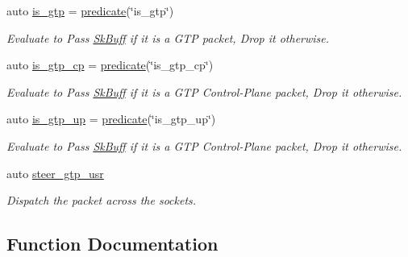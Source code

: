 \begin{DoxyCompactItemize}
auto \hyperlink{namespacepfq_1_1lang_1_1experimental_1_1anonymous__namespace_02experimental_8hpp_03_a2eb9e54a6fc6170b246cf3149445a2c4}{is\+\_\+gtp} = \hyperlink{namespacepfq_1_1lang_aca9adafc436b7f851621b979fa1aaf88}{predicate}(\char`\"{}is\+\_\+gtp\char`\"{})
\begin{DoxyCompactList}\small\item\em Evaluate to {\ttfamily Pass} \hyperlink{structpfq_1_1lang_1_1SkBuff}{Sk\+Buff} if it is a G\+TP packet, {\ttfamily Drop} it otherwise. \end{DoxyCompactList}\item 
auto \hyperlink{namespacepfq_1_1lang_1_1experimental_1_1anonymous__namespace_02experimental_8hpp_03_ade25d79513e3131a54a05e23d25a7539}{is\+\_\+gtp\+\_\+cp} = \hyperlink{namespacepfq_1_1lang_aca9adafc436b7f851621b979fa1aaf88}{predicate}(\char`\"{}is\+\_\+gtp\+\_\+cp\char`\"{})
\begin{DoxyCompactList}\small\item\em Evaluate to {\ttfamily Pass} \hyperlink{structpfq_1_1lang_1_1SkBuff}{Sk\+Buff} if it is a G\+TP Control-\/\+Plane packet, {\ttfamily Drop} it otherwise. \end{DoxyCompactList}\item 
auto \hyperlink{namespacepfq_1_1lang_1_1experimental_1_1anonymous__namespace_02experimental_8hpp_03_a8c12f3cb8c8faaab619e0feb874ed0c3}{is\+\_\+gtp\+\_\+up} = \hyperlink{namespacepfq_1_1lang_aca9adafc436b7f851621b979fa1aaf88}{predicate}(\char`\"{}is\+\_\+gtp\+\_\+up\char`\"{})
\begin{DoxyCompactList}\small\item\em Evaluate to {\ttfamily Pass} \hyperlink{structpfq_1_1lang_1_1SkBuff}{Sk\+Buff} if it is a G\+TP Control-\/\+Plane packet, {\ttfamily Drop} it otherwise. \end{DoxyCompactList}\item 
auto \hyperlink{namespacepfq_1_1lang_1_1experimental_1_1anonymous__namespace_02experimental_8hpp_03_a6b08a2b49251677736f1939eaadac4a6}{steer\+\_\+gtp\+\_\+usr}
\begin{DoxyCompactList}\small\item\em Dispatch the packet across the sockets. \end{DoxyCompactList}\end{DoxyCompactItemize}


\subsection{Function Documentation}
